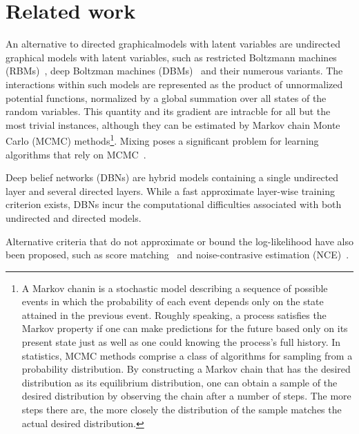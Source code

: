 \documentclass[10pt,twocolumn,letterpaper]{article}
\begin{document}
\section{Related work}
\par An alternative to directed graphicalmodels with latent variables are undirected graphical models with latent variables, such as restricted Boltzmann machines (RBMs)~\cite{smolensky1986information}, deep Boltzman machines (DBMs)~\cite{salakhutdinov2010efficient} and their numerous variants. The interactions within such models are represented as the product of unnormalized potential functions, normalized by a global summation over all states of the random variables. This quantity and its gradient are intracble for all but the most trivial instances, although they can be estimated by Markov chain Monte Carlo (MCMC) methods\footnote{A Markov chanin is a stochastic model describing a sequence of possible events in which the probability of each event depends only on the state attained in the previous event. Roughly speaking, a process satisfies the Markov property if one can make predictions for the future based only on its present state just as well as one could knowing the process's full history. In statistics, MCMC methods comprise a class of algorithms for sampling from a probability distribution. By constructing a Markov chain that has the desired distribution as its equilibrium distribution, one can obtain a sample of the desired distribution by observing the chain after a number of steps. The more steps there are, the more closely the distribution of the sample matches the actual desired distribution.}. Mixing poses a significant problem for learning algorithms that rely on MCMC~\cite{bengio2013better}.
\par Deep belief networks (DBNs) are hybrid models containing a single undirected layer and several directed layers. While a fast approximate layer-wise training criterion exists, DBNs incur the computational difficulties associated with both undirected and directed models.
\par Alternative criteria that do not approximate or bound the log-likelihood have also been proposed, such as score matching~\cite{Hyv2005Estimation} and noise-contrasive estimation (NCE)~\cite{Gutmann2010Noise}.

  
 
\end{document}
